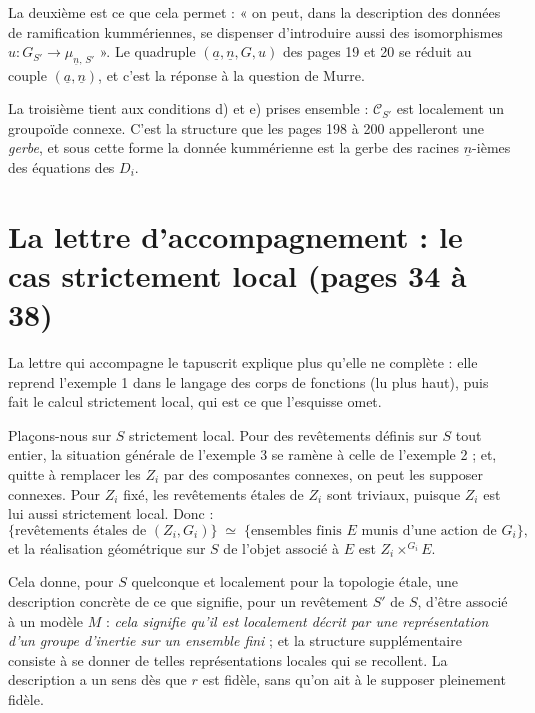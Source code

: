 \documentclass[11pt,a4paper]{article}
\begin{document}
La deuxième est ce que cela permet : « on peut, dans la description des données
de ramification kummériennes, se dispenser d'introduire aussi des isomorphismes
$u : G_{S'} \to \mu_{\underline{n},\,S'}$ ». Le quadruple
$(\underline{a}, \underline{n}, G, u)$ des pages 19 et 20 se réduit au couple
$(\underline{a}, \underline{n})$, et c'est la réponse à la question de Murre.

La troisième tient aux conditions d) et e) prises ensemble : $\mathcal{C}_{S'}$
est localement un groupoïde connexe. C'est la structure que les pages 198 à 200
appelleront une \emph{gerbe}, et sous cette forme la donnée kummérienne est la
gerbe des racines $\underline{n}$-ièmes des équations des $D_{i}$.

\section*{La lettre d'accompagnement : le cas strictement local (pages 34 à 38)}

La lettre qui accompagne le tapuscrit explique plus qu'elle ne complète :
elle reprend l'exemple 1 dans le langage des corps de fonctions (lu plus haut), puis fait le calcul strictement local, qui est ce que l'esquisse omet.

Plaçons-nous sur $S$ strictement local. Pour des revêtements définis sur $S$
tout entier, la situation générale de l'exemple 3 se ramène à celle de
l'exemple 2 ; et, quitte à remplacer les $Z_{i}$ par des composantes connexes,
on peut les supposer connexes. Pour $Z_{i}$ fixé, les revêtements étales de
$Z_{i}$ sont triviaux, puisque $Z_{i}$ est lui aussi strictement local. Donc :
\[
  \bigl\{\text{revêtements étales de } (Z_{i}, G_{i})\bigr\}
  \;\simeq\;
  \bigl\{\text{ensembles finis } E \text{ munis d'une action de } G_{i}\bigr\} ,
\]
et la réalisation géométrique sur $S$ de l'objet associé à $E$ est
$Z_{i} \times^{G_{i}} E$.

Cela donne, pour $S$ quelconque et localement pour la topologie étale, une
description concrète de ce que signifie, pour un revêtement $S'$ de $S$, d'être
associé à un modèle $M$ : \emph{cela signifie qu'il est localement décrit par
une représentation d'un groupe d'inertie sur un ensemble fini} ; et la
structure supplémentaire consiste à se donner de telles représentations locales
qui se recollent. La description a un sens dès que $r$ est fidèle, sans qu'on
ait à le supposer pleinement fidèle.
\end{document}
